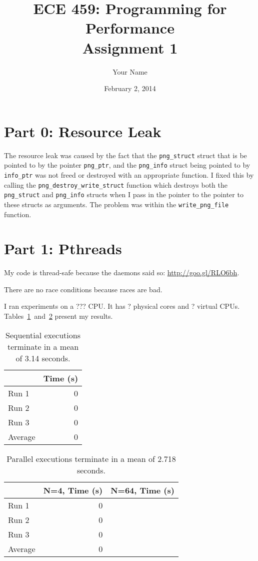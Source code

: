 \documentclass[12pt]{article}
\title{ECE 459: Programming for Performance\\Assignment 1}
\author{Your Name}
\date{February 2, 2014}
\newcommand{\physicalcores}{?}
\newcommand{\virtualcpus}{?}
\begin{document}
\maketitle

\section*{Part 0: Resource Leak}

The resource leak was caused by the fact that the {\tt png\_struct} struct that is be pointed to by the pointer {\tt png\_ptr}, and the {\tt png\_info} struct being pointed to by {\tt info\_ptr} was not freed or destroyed with an appropriate function. I fixed this by calling the {\tt png\_destroy\_write\_struct} function which destroys both the {\tt png\_struct} and {\tt png\_info} structs when I pass in the pointer to the pointer to these structs as arguments. The problem was within the {\tt write\_png\_file} function.

\section*{Part 1: Pthreads}

My code is thread-safe because the daemons said so: \url{http://goo.gl/RLO6bh}.

There are no race conditions because races are bad.

I ran experiments on a ??? CPU. It has \physicalcores{} physical cores and \virtualcpus{} virtual
CPUs. Tables~\ref{tbl_sequential}~and~\ref{tbl_parallel} present my results.

\begin{table}[H]
  \centering
  \begin{tabular}{lr}
    & {\bf Time (s)} \\
    \hline
    Run 1 & 0 \\
    Run 2 & 0 \\
    Run 3 & 0 \\
    \hline
    Average & 0 \\
  \end{tabular}
  \caption{\label{tbl_sequential}Sequential executions terminate in a mean of 3.14 seconds.}
\end{table}

\begin{table}[H]
  \centering
  \begin{tabular}{lrr}
    & {\bf N=4, Time (s)} & {\bf N=64, Time (s)} \\
    \hline
    Run 1 & 0 \\
    Run 2 & 0 \\
    Run 3 & 0 \\
    \hline
    Average & 0 \\
  \end{tabular}
  \caption{\label{tbl_parallel}Parallel executions terminate in a mean of 2.718 seconds.}
\end{table}
\end{document}
